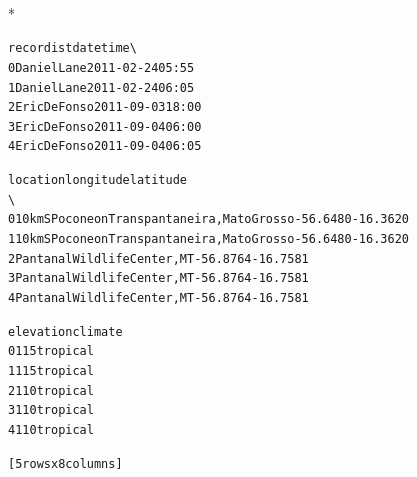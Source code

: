 \documentclass[letterpaper,10pt,english]{/usr/share/sphinx/texinputs/sphinxhowto}
\def\smaller{\fontsize{9.5pt}{9.5pt}\selectfont}
\newenvironment{InvisibleVerbatim}
        {\begin{mdframed}[leftmargin=0.1\linewidth,innerleftmargin=3pt,innerrightmargin=3pt, userdefinedwidth=1\linewidth, linewidth=0pt, linecolor=white, usetwoside=false]}
        {\end{mdframed}}
\begin{document}
                \makebox[0.1\linewidth]{\smaller\hfill\tt\color{nbframe-out-prompt}Out\hspace{4pt}{[}36{]}:\hspace{4pt}}\\*
                \vspace{-2.55\baselineskip}\begin{InvisibleVerbatim}
                \vspace{-0.5\baselineskip}
\begin{alltt}      recordist        date   time  \textbackslash{}
0   Daniel Lane  2011-02-24  05:55
1   Daniel Lane  2011-02-24  06:05
2  Eric DeFonso  2011-09-03  18:00
3  Eric DeFonso  2011-09-04  06:00
4  Eric DeFonso  2011-09-04  06:05

                                         location  longitude  latitude
\textbackslash{}
0  10 km S Pocone on Transpantaneira, Mato Grosso   -56.6480  -16.3620
1  10 km S Pocone on Transpantaneira, Mato Grosso   -56.6480  -16.3620
2                    Pantanal Wildlife Center, MT   -56.8764  -16.7581
3                    Pantanal Wildlife Center, MT   -56.8764  -16.7581
4                    Pantanal Wildlife Center, MT   -56.8764  -16.7581

  elevation   climate
0       115  tropical
1       115  tropical
2       110  tropical
3       110  tropical
4       110  tropical

[5 rows x 8 columns]\end{alltt}

            \end{InvisibleVerbatim}
            
        
    


\end{document}
